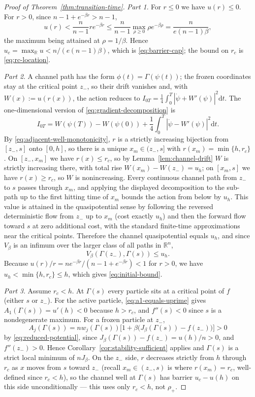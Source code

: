 \documentclass{article}
\newcommand{\dd}{\mathrm d}
\theoremstyle{plain}
\theoremstyle{definition}
\theoremstyle{remark}
\newcommand{\prefactor}[2]{A_{#1}(#2)}
\newcommand{\R}{\mathbb{R}}
\begin{document}
\begin{proof}[Proof of Theorem~\ref{thm:transition-time}]
    \emph{Part 1.} For $r\le0$ we have $u(r)\le0$. For $r>0$, since $n-1+e^{-\beta r}>n-1$,
    \[
        u(r)<\frac{n}{n-1}re^{-\beta r}\le\frac{n}{n-1}\max_{\rho\ge0}\rho e^{-\beta\rho}=\frac{n}{e(n-1)\beta},
    \]
    the maximum being attained at $\rho=1/\beta$. Hence $u_c=\max_\R u<n/(e(n-1)\beta)$, which is \eqref{eq:barrier-cap}; the bound on $r_c$ is \eqref{eq:rc-location}.

    \emph{Part 2.} A channel path has the form $\phi(t)=\Gamma(\psi(t))$; the frozen coordinates stay at the critical point $z_-$, so their drift vanishes and, with $W(x):=u(r(x))$, the action reduces to $I_{0T}=\frac14\int_0^T|\dot\psi+W'(\psi)|^2\dd t$. The one-dimensional version of \eqref{eq:gradient-decomposition} is
    \[
        I_{0T}=W(\psi(T))-W(\psi(0))+\frac14\int_0^T|\dot\psi-W'(\psi)|^2\dd t.
    \]
    By \eqref{eq:adjacent-well-monotonicity}, $r$ is a strictly increasing bijection from $[z_-,s]$ onto $[0,h]$, so there is a unique $x_m\in(z_-,s]$ with $r(x_m)=\min\{h,r_c\}$. On $[z_-,x_m]$ we have $r(x)\le r_c$, so by Lemma~\ref{lem:channel-drift} $W$ is strictly increasing there, with total rise $W(x_m)-W(z_-)=u_h$; on $[x_m,s]$ we have $r(x)\ge r_c$, so $W$ is nonincreasing. Every continuous channel path from $z_-$ to $s$ passes through $x_m$, and applying the displayed decomposition to the sub-path up to the first hitting time of $x_m$ bounds the action from below by $u_h$. This value is attained in the quasipotential sense by following the reversed deterministic flow from $z_-$ up to $x_m$ (cost exactly $u_h$) and then the forward flow toward $s$ at zero additional cost, with the standard finite-time approximations near the critical points. Therefore the channel quasipotential equals $u_h$, and since $V_\beta$ is an infimum over the larger class of all paths in $\R^n$,
    \[
        V_\beta(\Gamma(z_-),\Gamma(s))\le u_h.
    \]
    Because $u(r)/r=ne^{-\beta r}/(n-1+e^{-\beta r})<1$ for $r>0$, we have $u_h<\min\{h,r_c\}\le h$, which gives \eqref{eq:initial-bound}.

    \emph{Part 3.} Assume $r_c<h$. At $\Gamma(s)$ every particle sits at a critical point of $f$ (either $s$ or $z_-$). For the active particle, \eqref{eq:a1-equals-uprime} gives $\prefactor{1}{\Gamma(s)}=u'(h)<0$ because $h>r_c$, and $f''(s)<0$ since $s$ is a nondegenerate maximum. For a frozen particle at $z_-$,
    \[
        \prefactor{j}{\Gamma(s)} = nw_j(\Gamma(s))\bigl[1+\beta\bigl(J_\beta(\Gamma(s))-f(z_-)\bigr)\bigr]>0
    \]
    by \eqref{eq:reduced-potential}, since $J_\beta(\Gamma(s))-f(z_-)=u(h)/n>0$, and $f''(z_-)>0$. Hence Corollary~\ref{cor:stability-sufficient} applies and $\Gamma(s)$ is a strict local minimum of $nJ_\beta$. On the $z_-$ side, $r$ decreases strictly from $h$ through $r_c$ as $x$ moves from $s$ toward $z_-$ (recall $x_m\in(z_-,s)$ is where $r(x_m)=r_c$, well-defined since $r_c<h$), so the channel well at $\Gamma(s)$ has barrier $u_c-u(h)$ on this side unconditionally --- this uses only $r_c<h$, not $\rho_+$.


\end{proof}
\end{document}
